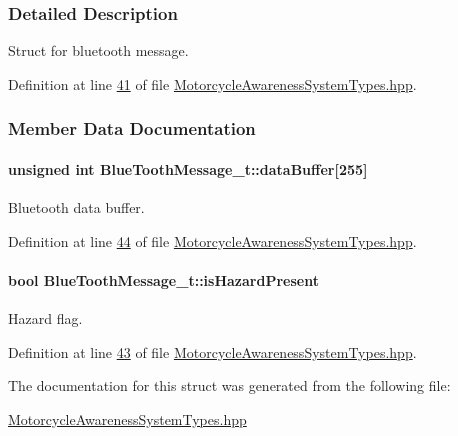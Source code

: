 \subsubsection{Detailed Description}
Struct for bluetooth message. 

Definition at line \hyperlink{MotorcycleAwarenessSystemTypes_8hpp_source_l00041}{41} of file \hyperlink{MotorcycleAwarenessSystemTypes_8hpp_source}{Motorcycle\-Awareness\-System\-Types.\-hpp}.



\subsubsection{Member Data Documentation}
\hypertarget{structBlueToothMessage__t_ab872789a32f068dae8bcf77122256b78}{
\paragraph[{data\-Buffer}]{\setlength{\rightskip}{0pt plus 5cm}unsigned int Blue\-Tooth\-Message\-\_\-t\-::data\-Buffer\mbox{[}255\mbox{]}}}\label{structBlueToothMessage__t_ab872789a32f068dae8bcf77122256b78}


Bluetooth data buffer. 



Definition at line \hyperlink{MotorcycleAwarenessSystemTypes_8hpp_source_l00044}{44} of file \hyperlink{MotorcycleAwarenessSystemTypes_8hpp_source}{Motorcycle\-Awareness\-System\-Types.\-hpp}.

\hypertarget{structBlueToothMessage__t_a2dd315aa1cba1d2d3045e26b9f171e61}{
\paragraph[{is\-Hazard\-Present}]{\setlength{\rightskip}{0pt plus 5cm}bool Blue\-Tooth\-Message\-\_\-t\-::is\-Hazard\-Present}}\label{structBlueToothMessage__t_a2dd315aa1cba1d2d3045e26b9f171e61}


Hazard flag. 



Definition at line \hyperlink{MotorcycleAwarenessSystemTypes_8hpp_source_l00043}{43} of file \hyperlink{MotorcycleAwarenessSystemTypes_8hpp_source}{Motorcycle\-Awareness\-System\-Types.\-hpp}.



The documentation for this struct was generated from the following file\-:\begin{DoxyCompactItemize}
\item 
\hyperlink{MotorcycleAwarenessSystemTypes_8hpp}{Motorcycle\-Awareness\-System\-Types.\-hpp}\end{DoxyCompactItemize}
